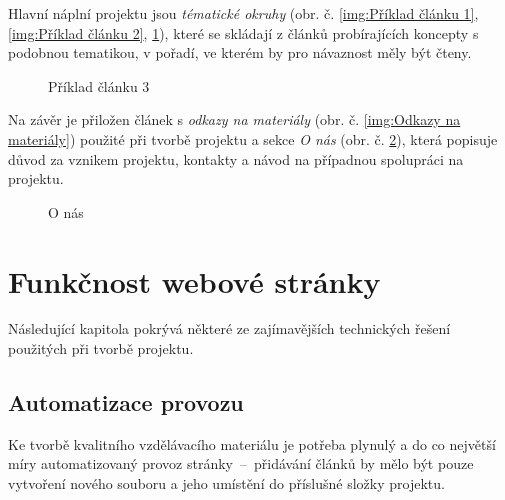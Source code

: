 \documentclass[a4paper, 12pt]{article}
\begin{document}
  Hlavní náplní projektu jsou \emph{tématické okruhy} (obr. č. \ref{img:Příklad článku 1}, \ref{img:Příklad článku 2}, \ref{img:Příklad článku 3}), které se skládají z článků probírajících koncepty s podobnou tematikou, v pořadí, ve kterém by pro návaznost měly být čteny.

  \begin{figure}[H]
      \caption{Příklad článku 1} \label{img:Příklad článku 1}
    \endminipage\hfill
      \caption{Příklad článku 2} \label{img:Příklad článku 2}
    \endminipage\hfill
      \caption{Příklad článku 3} \label{img:Příklad článku 3}
    \endminipage
  \end{figure}

  Na závěr je přiložen článek s \emph{odkazy na materiály} (obr. č. \ref{img:Odkazy na materiály}) použité při tvorbě projektu a sekce \emph{O nás} (obr. č. \ref{img:O nás}), která popisuje důvod za vznikem projektu, kontakty a návod na případnou spolupráci na projektu.

  \begin{figure}[H]
      \caption{Odkazy na materiály} \label{img:Odkazy na materiály}
    \endminipage\hfill
      \caption{O nás} \label{img:O nás}
    \endminipage
  \end{figure}


  \section{Funkčnost webové stránky}
  Následující kapitola pokrývá některé ze zajímavějších technických řešení použitých při tvorbě projektu.


  \subsection{Automatizace provozu} \label{sec:Automatizace provozu}
  Ke tvorbě kvalitního vzdělávacího materiálu je potřeba plynulý a do co největší míry automatizovaný provoz stránky~--~přidávání článků by mělo být pouze vytvoření nového souboru a jeho umístění do příslušné složky projektu.
\end{document}

